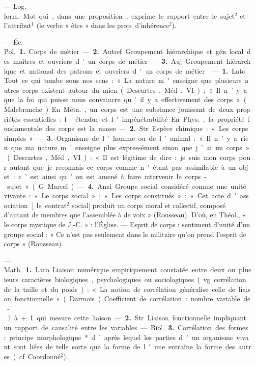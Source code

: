 \begin{itemize}[leftmargin=1cm, label=, itemsep=11pt]
 — \si{Log. form.} Mot qui, dans
une proposition, exprime le rapport
entre le sujet$^2$ et l’attribut$^1$ (le verbe
« être » dans les prop. d’inhérence$^2$).

 — \si{Éc. Pol.} {\bf 1.} Corps de
métier. —  {\bf 2.} Autref. Groupement
hiérarchique et gén. local des maîtres et ouvriers d’un corps de métier.
—  {\bf 3.} Auj. Groupement hiérarchique
et national des patrons et ouvriers
d'un corps de métier.

 — {\bf 1.} Lato. Tout ce qui tombe
sous nos sens : « La nature m'enseigne que plusieurs autres corps
existent autour du mien (Descartes,
Méd., VI); « Il n’y a que la foi qui
puisse nous convaincre qu'il y a
effectivement des corps » (Malebranche). En \si{Méta.}, un corps est
une substance jouissant de deux
propriétés essentielles : l'étendue et
l'impénétrabilité. En \si{Phys.}, la propriété fondamentale des corps est la
masse. —  {\bf 2.} Str. Espèce chimique :
« Les corps simples ».

—  {\bf 3.} Organisme de l’homme ou
de l’animal : « Il n’y a rien que ma
nature m'enseigne plus expressément sinon que j’ai un corps » (Descartes, Méd., VI) : « Il est légitime
de dire : je suis mon corps pour
autant que je reconnais ce corps
comme n'étant pas assimilable à
un objet : c’est ainsi qu’on est amené
à faire intervenir le corps-sujet »
(G. Marcel).

—  {\bf 4.} Anal. Groupe social considéré comme une unité vivante : « Le
corps social »; « Les corps constitués »; « Cet acte d'association [le
contrat$^2$ social] produit un corps
moral et collectif, composé d’autant
de membres que l’assemblée à de
voix » (Rousseau). D’où, en Théol.,
« le corps mystique de J.-C. » :
l'Église. — Esprit de corps : sentiment d'unité d’un groupe social :
« Ce n’est pas seulement dans le militaire qu'on prend l'esprit de corps »
(Rousseau).

 — \si{Math.} {\bf 1.} Lato. Liaison
numérique empiriquement constatée
entre deux ou plusieurs caractères
biologiques, psychologiques ou sociologiques (vg. corrélation de la taille
et du poids) : « La notion de corrélation généralise celle de liaison
fonctionnelle » (Darmois). Coefficient de corrélation : nombre variable de - 1 à + 1 qui mesure cette
liaison. —  {\bf 2.} Str. Liaison fonctionnelle
impliquant un rapport de causalité entre les variables.

— \si{Biol.}  {\bf 3.} Corrélation des formes :
principe morphologique* d’après lequel les parties d’un organisme
vivant sont liées de telle sorte que
la forme de l'une entraîne la forme
des autres (cf. Coordonné$^2$).


\end{itemize}
